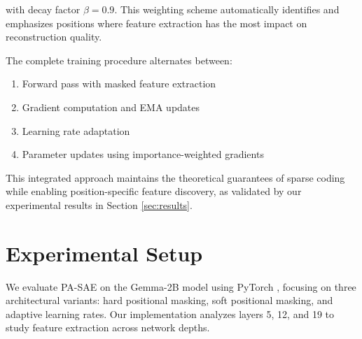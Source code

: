 \documentclass{article} %
\begin{document}
with decay factor $\beta=0.9$. This weighting scheme automatically identifies and emphasizes positions where feature extraction has the most impact on reconstruction quality.

The complete training procedure alternates between:
\begin{enumerate}
    \item Forward pass with masked feature extraction
    \item Gradient computation and EMA updates
    \item Learning rate adaptation
    \item Parameter updates using importance-weighted gradients
\end{enumerate}

This integrated approach maintains the theoretical guarantees of sparse coding while enabling position-specific feature discovery, as validated by our experimental results in Section \ref{sec:results}.

\section{Experimental Setup}
\label{sec:experimental}

We evaluate PA-SAE on the Gemma-2B model using PyTorch \cite{paszke2019pytorch}, focusing on three architectural variants: hard positional masking, soft positional masking, and adaptive learning rates. Our implementation analyzes layers 5, 12, and 19 to study feature extraction across network depths.
\end{document}
